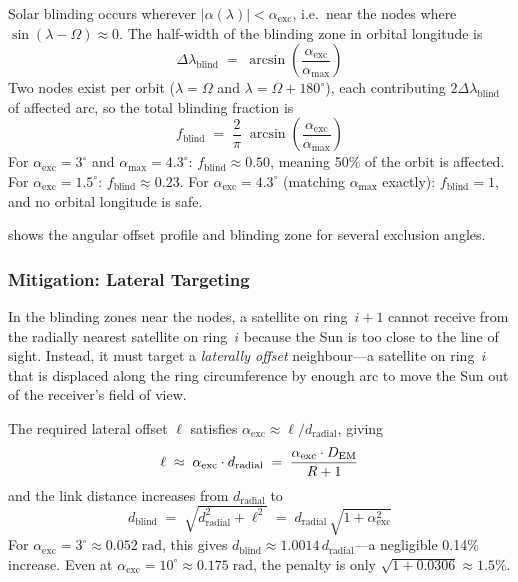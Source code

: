 Solar blinding occurs wherever $|\alpha(\lambda)| < \alpha_{\mathrm{exc}}$,
i.e.\ near the nodes where $\sin(\lambda - \Omega) \approx 0$.
The half-width of the blinding zone in orbital longitude is
%
\begin{equation}\label{eq:lambda-blind}
  \Delta\lambda_{\mathrm{blind}} \;=\; \arcsin\!\left(
  \frac{\alpha_{\mathrm{exc}}}{\alpha_{\max}}\right)
\end{equation}
%
Two nodes exist per orbit ($\lambda = \Omega$ and $\lambda = \Omega + 180^\circ$),
each contributing $2\Delta\lambda_{\mathrm{blind}}$ of affected arc, so the total
blinding fraction is
%
\begin{equation}\label{eq:f-blind}
  f_{\mathrm{blind}} \;=\; \frac{2}{\pi}\;\arcsin\!\left(
  \frac{\alpha_{\mathrm{exc}}}{\alpha_{\max}}\right)
\end{equation}
%
For $\alpha_{\mathrm{exc}} = 3^\circ$ and $\alpha_{\max} = 4.3^\circ$:
$f_{\mathrm{blind}} \approx 0.50$, meaning 50\% of the orbit is affected.
For $\alpha_{\mathrm{exc}} = 1.5^\circ$: $f_{\mathrm{blind}} \approx 0.23$.
For $\alpha_{\mathrm{exc}} = 4.3^\circ$ (matching $\alpha_{\max}$ exactly):
$f_{\mathrm{blind}} = 1$, and no orbital longitude is safe.

 shows the angular offset profile and blinding zone
for several exclusion angles.

\subsubsection{Mitigation: Lateral Targeting}

In the blinding zones near the nodes, a satellite on ring~$i\!+\!1$ cannot receive
from the radially nearest satellite on ring~$i$ because the Sun is too close to the
line of sight. Instead, it must target a \emph{laterally offset} neighbour---a
satellite on ring~$i$ that is displaced along the ring circumference by enough arc
to move the Sun out of the receiver's field of view.

The required lateral offset $\ell$ satisfies
$\alpha_{\mathrm{exc}} \approx \ell / d_{\mathrm{radial}}$, giving
%
\begin{equation}
  \ell \;\approx\; \alpha_{\mathrm{exc}} \cdot d_{\mathrm{radial}}
  \;=\; \frac{\alpha_{\mathrm{exc}} \cdot D_{\mathrm{EM}}}{R+1}
\end{equation}
%
and the link distance increases from $d_{\mathrm{radial}}$ to
%
\begin{equation}\label{eq:d-blinding}
  d_{\mathrm{blind}} \;=\; \sqrt{d_{\mathrm{radial}}^2 + \ell^2}
  \;=\; d_{\mathrm{radial}}\,\sqrt{1 + \alpha_{\mathrm{exc}}^2}
\end{equation}
%
For $\alpha_{\mathrm{exc}} = 3^\circ \approx 0.052\;\text{rad}$, this gives
$d_{\mathrm{blind}} \approx 1.0014\,d_{\mathrm{radial}}$---a negligible 0.14\%
increase. Even at $\alpha_{\mathrm{exc}} = 10^\circ \approx 0.175\;\text{rad}$,
the penalty is only $\sqrt{1 + 0.0306} \approx 1.5\%$.

